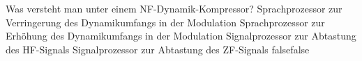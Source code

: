     {Was versteht man unter einem NF-Dynamik-Kompressor?}
    {Sprachprozessor zur Verringerung des Dynamikumfangs in der Modulation}
    {Sprachprozessor zur Erhöhung des Dynamikumfangs in der Modulation}
    {Signalprozessor zur Abtastung des HF-Signals}
    {Signalprozessor zur Abtastung des ZF-Signals}
    {false}{false}